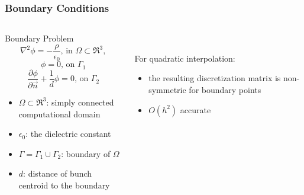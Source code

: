 \documentclass[xcolor=pdftex,table,10pt,yellow,mathserif]{beamer}
\begin{document}
\begin{frame}
		\frametitle{Boundary Conditions}

		\begin{columns}
		\begin{column}{5cm}

		\begin{block}{Boundary Problem}
            \[
	    		\nabla^2 \phi = -\frac{\rho}{\epsilon_0} \text{, in } \Omega \subset \Re^3 , \nonumber 
            \]
            \[
                \phi = 0 \text{, on }\Gamma_1  
            \]
            \[
                \frac{\partial \phi}{\partial \vec{n}} + \frac {1}{d} \phi = 0  \text{, on } \Gamma_2
            \]
		\end{block}
        \begin{itemize}
		\item $\Omega \subset \Re^3$: simply connected computational domain
		\item $\epsilon_0$: the dielectric constant
        \item $\Gamma= \Gamma_1 \cup \Gamma_2$: boundary of $\Omega$
        \item $d$: distance of bunch centroid to the boundary
        \end{itemize}
		
		\end{column}
		\begin{column}{5cm}
            \begin{center}
             \\
            \end{center}
            \vspace{0.2cm} 
			
    			For quadratic interpolation:
	    		\begin{itemize}
			\item the resulting discretization matrix is non-symmetric for boundary points
			\item $O(h^2)$ accurate
		\end{itemize}
    		
		\end{column}
		\end{columns}
		
	\end{frame}
\end{document}
